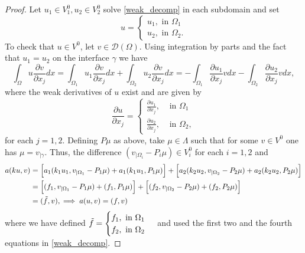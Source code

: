 \begin{proof}
    Let \(u_1 \in V_1^0, u_2 \in V_2^0\) solve \eqref{weak_decomp} in each subdomain and set
    \[
    u=\begin{cases}
        u_1, \text{ in } \Omega_1\\
        u_2, \text{ in } \Omega_2.
    \end{cases}
    \]
    To check that \(u \in V^0\), let \(v \in \mathcal{D}(\Omega)\). Using integration by parts and the fact that \(u_1 = u_2\) on the interface \(\gamma\) we have
    \[
        \int_\Omega u \frac{\partial v}{\partial x_j} dx =  \int_{\Omega_1} u_1 \frac{\partial v}{\partial x_j} dx + \int_{\Omega_2} u_2 \frac{\partial v}{\partial x_j} dx = -\int_{\Omega_1} \frac{\partial u_1}{\partial x_j} v dx - \int_{\Omega_2} \frac{\partial u_2}{\partial x_j} v dx,
    \]
    where the weak derivatives of \(u\) exist and are given by
    \[
        \frac{\partial u}{\partial x_j} =
        \begin{cases}
            \frac{\partial u_1}{\partial x_j}, & \text{ in } \Omega_1\\
            \frac{\partial u_2}{\partial x_j}, & \text{ in } \Omega_2,
        \end{cases}
    \]
    for each \(j=1,2\).
    Defining \(P \mu\) as above, take \(\mu \in \Lambda\) such that for some \(v \in V^0\) one has \(\mu = v_{|\gamma}\). Thus, the difference \((v_{|\Omega_i} - P_i \mu) \in V^0_i\) for each \(i=1, 2\) and
    \begin{align*}
        a(k u, v) &= \Big[a_1(k_1 u_1, v_{|\Omega_1} - P_1 \mu) + a_1(k_1 u_1, P_1\mu)\Big] + \Big[a_2(k_2 u_2, v_{|\Omega_2} - P_2 \mu) + a_2(k_2 u_2, P_2\mu)\Big]\\
        &=\Big[(f_1, v_{|\Omega_1} - P_1 \mu) + (f_1, P_1 \mu) \Big] + \Big[(f_2, v_{|\Omega_2} - P_2 \mu) + (f_2, P_2 \mu) \Big]\\
        &=(\Tilde{f}, v), \implies a(u, v) = (f, v)
    \end{align*}
    where we have defined \(\Tilde{f} = \begin{cases}
        f_1, \text{ in } \Omega_1\\
        f_2, \text{ in } \Omega_2
    \end{cases}\)
   and used the first two and the fourth equations in \eqref{weak_decomp}.
\end{proof}